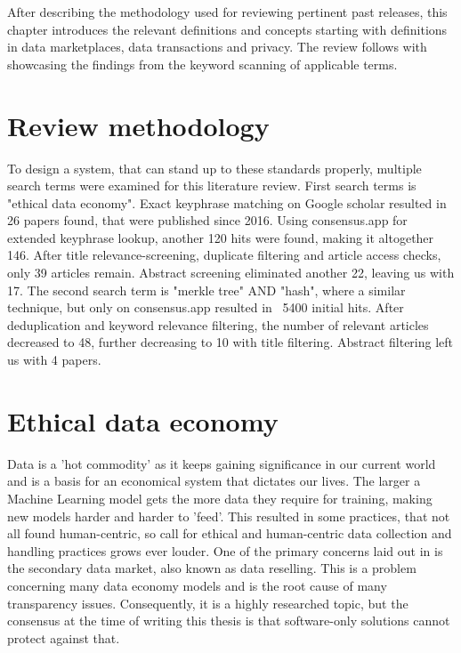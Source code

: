 \documentclass[a4paper,11pt]{report} %
\theoremstyle{change}
\theoremstyle{theoremstyle}
\begin{document}
After describing the methodology used for reviewing pertinent past releases, this chapter introduces the relevant definitions and concepts starting with definitions in data marketplaces, data transactions and privacy.
The review follows with showcasing the findings from the keyword scanning of applicable terms.

\section{Review methodology}
To design a system, that can stand up to these standards properly, multiple search terms were examined for this literature review. First search terms is "ethical data economy". Exact keyphrase matching on Google scholar \cite{scholargoogle_ethicaldataeconomy2026} resulted in 26 papers found, that were published since 2016.
Using consensus.app \cite{consensus_ethicaldataeconomy2026} for extended keyphrase lookup, another 120 hits were found, making it altogether 146. After title relevance-screening, duplicate filtering and article access checks, only 39 articles remain. Abstract screening eliminated another 22, leaving us with 17.
The second search term is "merkle tree" AND "hash", where a similar technique, but only on consensus.app \cite{consensus_merkleandhash2026} resulted in ~5400 initial hits. After deduplication and keyword relevance filtering, the number of relevant articles decreased to 48, further decreasing to 10 with title filtering. Abstract filtering left us with 4 papers.



\section{Ethical data economy}

Data is a 'hot commodity' as it keeps gaining significance in our current world and is a basis for an economical system that dictates our lives. The larger a Machine Learning model gets the more data they require for training, making new models harder and harder to 'feed'. This resulted in some practices, that not all found human-centric, so call for ethical and human-centric data collection and handling practices grows ever louder.
One of the primary concerns laid out in \cite{hyrynsalmi2023balancing} is the secondary data market, also known as data reselling. This is a problem concerning many data economy models and is the root cause of many transparency issues. Consequently, it is a highly researched topic, but the consensus at the time of writing this thesis is that software-only solutions cannot protect against that.\\
\end{document}
